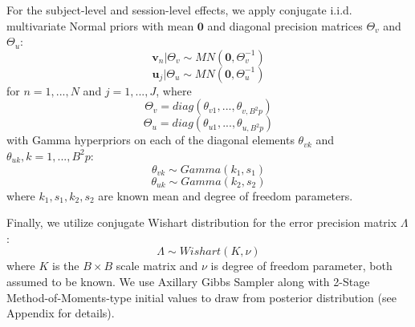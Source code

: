 \documentclass[12pt]{elsarticle}
\begin{document}
		
		For the subject-level and session-level effects, we apply conjugate i.i.d. multivariate Normal priors with mean $\boldsymbol{0}$ and diagonal precision matrices $\Theta_v$ and $\Theta_u$:
		\begin{equation} \label{eq:11}
			\boldsymbol{v}_{n}|\Theta_v \sim MN \left( \boldsymbol{0}, \Theta_v^{-1} \right)
		\end{equation}
		\begin{equation} \label{eq:12}
			\boldsymbol{u}_{j}|\Theta_u \sim MN \left( \boldsymbol{0}, \Theta_u^{-1} \right)
		\end{equation}
		for $n=1,...,N$ and $j=1,...,J$, where
		\begin{equation} \label{eq:13}
			\Theta_v = diag(\theta_{v1},...,\theta_{v,B^2p})
		\end{equation}
		\begin{equation} \label{eq:14}
			\Theta_u = diag(\theta_{u1},...,\theta_{u,B^2p})
		\end{equation}
		with Gamma hyperpriors on each of the diagonal elements $\theta_{vk}$ and $\theta_{uk}, k=1,...,B^2p$:
		\begin{equation} \label{eq:15}
			\theta_{vk} \sim Gamma(k_1, s_1)
		\end{equation}
		\begin{equation} \label{eq:16}
			\theta_{uk} \sim Gamma(k_2, s_2)
		\end{equation}
		where $k_1, s_1, k_2, s_2$ are known mean and degree of freedom parameters.
		
		Finally, we utilize conjugate Wishart distribution for the error precision matrix $\Lambda$:
		\begin{equation} \label{eq:17}
			\Lambda \sim Wishart(K, \nu)
		\end{equation}
		where $K$ is the $B \times B$ scale matrix and $\nu$ is degree of freedom parameter, both assumed to be known. 
		We use Axillary Gibbs Sampler along with 2-Stage Method-of-Moments-type initial values to draw from posterior distribution (see Appendix for details). 
		
		
		
		
		
		
		
		
\end{document}
